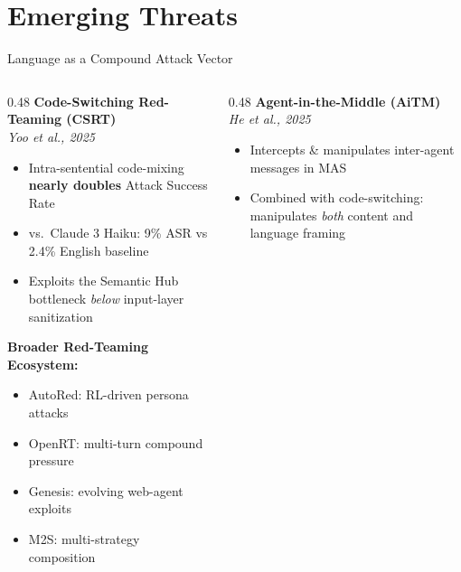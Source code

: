 \documentclass[11pt,aspectratio=169]{beamer}
\begin{document}
\section{Emerging Threats}

\begin{frame}{Language as a Compound Attack Vector}
    \begin{columns}[T]
        \begin{column}{0.48\textwidth}
            \textbf{\textcolor{highlightred}{Code-Switching Red-Teaming (CSRT)}}\\
            {\small \textit{Yoo et al., 2025}}
            \begin{itemize}
                \item Intra-sentential code-mixing \textbf{nearly doubles} Attack Success Rate
                \item vs.\ Claude 3 Haiku: 9\% ASR vs 2.4\% English baseline
                \item Exploits the Semantic Hub bottleneck \textit{below} input-layer sanitization
            \end{itemize}
            \vspace{0.2cm}
            \textbf{\textcolor{warnorange}{Broader Red-Teaming Ecosystem:}}
            \begin{itemize}
                \item AutoRed: RL-driven persona attacks
                \item OpenRT: multi-turn compound pressure
                \item Genesis: evolving web-agent exploits
                \item M2S: multi-strategy composition
            \end{itemize}
        \end{column}
        \begin{column}{0.48\textwidth}
            \textbf{\textcolor{accentblue}{Agent-in-the-Middle (AiTM)}}\\
            {\small \textit{He et al., 2025}}
            \begin{itemize}
                \item Intercepts \& manipulates inter-agent messages in MAS
                \item Combined with code-switching: manipulates \textit{both} content and language framing
            \end{itemize}

\end{column}
\end{columns}
\end{frame}
\end{document}
